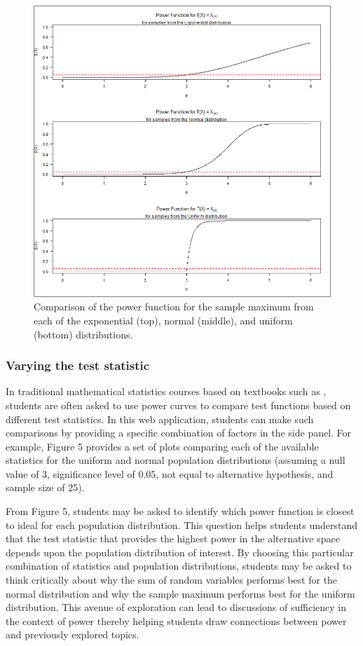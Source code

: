 \documentclass{TISE}
\begin{document}
\begin{figure}[H]
	\centering
	\includegraphics[scale=1]{fig4.png}
	\caption{Comparison of the power function for the sample maximum from each of the exponential (top), normal (middle), and uniform (bottom) distributions.}
\end{figure}

\subsubsection{Varying the test statistic}

In traditional mathematical statistics courses based on textbooks such as \cite{casella2002}, students are often asked to use power curves to compare test functions based on different test statistics. In this web application, students can make such comparisons by providing a specific combination of factors in the side panel. For example, Figure 5 provides a set of plots comparing each of the available statistics for the uniform and normal population distributions (assuming a null value of 3, significance level of 0.05, not equal to alternative hypothesis, and sample size of 25). 

From Figure 5, students may be asked to identify which power function is closest to ideal for each population distribution. This question helps students understand that the test statistic that provides the highest power in the alternative space depends upon the population distribution of interest. By choosing this particular combination of statistics and population distributions, students may be asked to think critically about why the sum of random variables performs best for the normal distribution and why the sample maximum performs best for the uniform distribution. This avenue of exploration can lead to discussions of sufficiency in the context of power thereby helping students draw connections between power and previously explored topics.  
\end{document}
